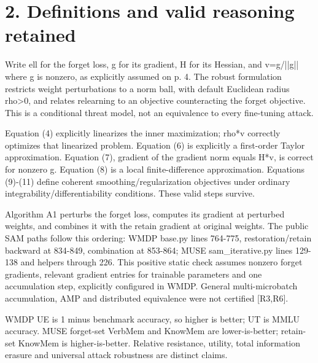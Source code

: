 \documentclass[10pt]{article}
\begin{document}
\section*{2. Definitions and valid reasoning retained}
Write ell for the forget loss, g for its gradient, H for its Hessian, and v=g/||g|| where g is nonzero, as explicitly assumed on p. 4. The robust formulation restricts weight perturbations to a norm ball, with default Euclidean radius rho>0, and relates relearning to an objective counteracting the forget objective. This is a conditional threat model, not an equivalence to every fine-tuning attack.\par
Equation (4) explicitly linearizes the inner maximization; rho*v correctly optimizes that linearized problem. Equation (6) is explicitly a first-order Taylor approximation. Equation (7), gradient of the gradient norm equals H*v, is correct for nonzero g. Equation (8) is a local finite-difference approximation. Equations (9)-(11) define coherent smoothing/regularization objectives under ordinary integrability/differentiability conditions. These valid steps survive.\par
Algorithm A1 perturbs the forget loss, computes its gradient at perturbed weights, and combines it with the retain gradient at original weights. The public SAM paths follow this ordering: WMDP base.py lines 764-775, restoration/retain backward at 834-849, combination at 853-864; MUSE sam\_iterative.py lines 129-138 and helpers through 226. This positive static check assumes nonzero forget gradients, relevant gradient entries for trainable parameters and one accumulation step, explicitly configured in WMDP. General multi-microbatch accumulation, AMP and distributed equivalence were not certified [R3,R6].\par
WMDP UE is 1 minus benchmark accuracy, so higher is better; UT is MMLU accuracy. MUSE forget-set VerbMem and KnowMem are lower-is-better; retain-set KnowMem is higher-is-better. Relative resistance, utility, total information erasure and universal attack robustness are distinct claims.\par
\end{document}

